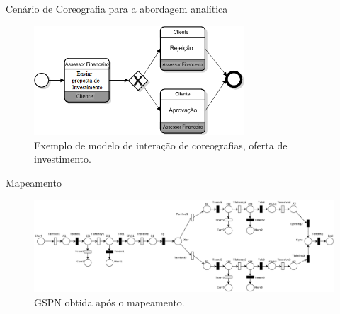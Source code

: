 \documentclass[xcolor=svgnames]{beamer}
\begin{document}
  \begin{frame}{Cenário de Coreografia para a abordagem analítica}
    \begin{figure}[!h]
	\centering
	\includegraphics[width=0.7\textwidth]{figures/Example-InteractionChor-br.png}
	\caption{Exemplo de modelo de interação de coreografias, oferta de investimento. }%
	\label{fig:Example-InteractionChor}
    \end{figure}
  \end{frame}

  \begin{frame}{Mapeamento}
    \begin{figure}[!h]
    	\centering
    	\includegraphics[width=1.0\textwidth]{BPMNChoreographyExample-QoS.png}
    	\caption{GSPN obtida após o mapeamento.}
    \end{figure}
  \end{frame}
\end{document}
